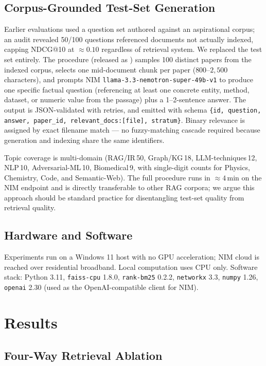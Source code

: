 \documentclass[journal]{IEEEtran}
\begin{document}
\subsection{Corpus-Grounded Test-Set Generation}
\label{sec:testset}
Earlier evaluations used a question set authored against an
aspirational corpus; an audit revealed 50/100 questions referenced
documents not actually indexed, capping NDCG@10 at $\approx 0.10$
regardless of retrieval system. We replaced the test set entirely.
The procedure (released as ) samples 100
distinct papers from the indexed corpus, selects one mid-document
chunk per paper ($800$--$2{,}500$ characters), and prompts NIM
\texttt{llama-3.3-nemotron-super-49b-v1} to produce one specific
factual question (referencing at least one concrete entity, method,
dataset, or numeric value from the passage) plus a 1--2-sentence
answer. The output is JSON-validated with retries, and emitted with
schema \texttt{\{id, question, answer, paper\_id,
relevant\_docs:[file], stratum\}}. Binary relevance is assigned by
exact filename match — no fuzzy-matching cascade required because
generation and indexing share the same identifiers.

Topic coverage is multi-domain (RAG/IR\,50, Graph/KG\,18,
LLM-techniques\,12, NLP\,10, Adversarial-ML\,10, Biomedical\,9, with
single-digit counts for Physics, Chemistry, Code, and Semantic-Web).
The full procedure runs in $\approx 4$\,min on the NIM endpoint and
is directly transferable to other RAG corpora; we argue this approach
should be standard practice for disentangling test-set quality from
retrieval quality.

\subsection{Hardware and Software}
Experiments run on a Windows 11 host with no GPU acceleration; NIM
cloud is reached over residential broadband. Local computation uses
CPU only. Software stack: Python 3.11, \texttt{faiss-cpu} 1.8.0,
\texttt{rank-bm25} 0.2.2, \texttt{networkx} 3.3, \texttt{numpy} 1.26,
\texttt{openai} 2.30 (used as the OpenAI-compatible client for NIM).

\section{Results}
\label{sec:results}

\subsection{Four-Way Retrieval Ablation}
\label{sec:ablation}
\end{document}
